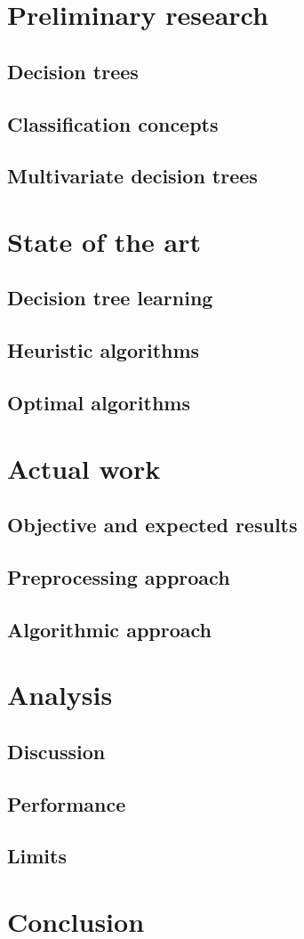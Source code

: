 \documentclass{report}
\begin{document}
\chapter{Preliminary research}
\section{Decision trees}
\section{Classification concepts} %
\section{Multivariate decision trees}


\chapter{State of the art}
\section{Decision tree learning} %
\section{Heuristic algorithms}
\section{Optimal algorithms}


\chapter{Actual work}
\section{Objective and expected results}
\section{Preprocessing approach}
\section{Algorithmic approach}


\chapter{Analysis}
\section{Discussion}
\section{Performance}
\section{Limits}


\chapter*{Conclusion}




\cite{multivariate-explaining} \cite{blossom} \cite{murtree} \cite{wiki-decision-tree}
\end{document}
